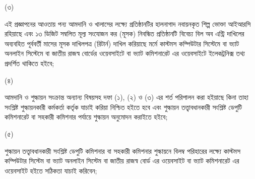 \documentclass[12pt]{article}
\begin{document}
\begin{minipage}[t]{0.05\linewidth}
\hspace{1em}
\end{minipage}
\begin{minipage}[t]{0.05\linewidth}
(৩)
\end{minipage}
\begin{minipage}[t]{0.9\linewidth}
এই প্রজ্ঞাপনের আওতায় পন্য আমদানি ও খালাসের লক্ষ্যে
প্রতিষ্ঠানটির হালনাগাদ নবায়নকৃত শিল্প ভোক্তা
আইআরসি রহিয়াছে এবং ১৩ ডিজিট সম্বলিত মূল্য
সংযোজন কর (মূসক) নিবন্ধিত প্রতিষ্ঠানটি বিবেচ্য
বিল অব এন্ট্রি দাখিলের অব্যবহিত পূর্ববর্তী মাসের
মূসক দাখিলপত্র (রিটার্ন) দাখিল করিয়াছে মর্মে
কাস্টমস  কম্পিউটার সিস্টেমে বা ভ্যাট অনলাইন সিস্টেমে
বা জাতীয় রাজস্ব বোর্ডের ওয়েবসাইটে বা ভ্যাট কমিশনারেট
এর ওয়েবসাইটে ইলেকট্রনিক্স তথ্য প্রদর্শিত থাকিতে হইবে;
\\
\end{minipage}
\begin{minipage}[t]{0.05\linewidth}
\hspace{1em}
\end{minipage}
\begin{minipage}[t]{0.05\linewidth}
(৪)
\end{minipage}
\begin{minipage}[t]{0.9\linewidth}
আমদানি ও শুল্কায়ন সংক্রান্ত অন্যান্য বিষয়সহ
দফা (১), (২) ও (৩) এর শর্ত পরিপালন করা হইয়াছে কিনা
তাহা সংশ্লিষ্ট শুল্কায়নকারী কর্মকর্তা কর্তৃক যাচাই করিয়া
নিশ্চিত হইতে হবে এবং শুল্কায়ন তত্ত্বাবধানকারী সংশ্লিষ্ট ডেপুটি
কমিশনারেট বা সহকারী কমিশনার পর্যায়ে শুল্কায়ন
অনুমোদন করাইতে হইবে;
\\
\end{minipage}
\begin{minipage}[t]{0.05\linewidth}
\hspace{1em}
\end{minipage}
\begin{minipage}[t]{0.05\linewidth}
(৫)
\end{minipage}
\begin{minipage}[t]{0.9\linewidth}
শুল্কায়ন তত্ত্বাবধানকারী সংশ্লিষ্ট ডেপুটি কমিশনার বা
সহকারী কমিশনার শুল্কায়নে বিলম্ব পরিহারের লক্ষ্যে
কাস্টমস কম্পিউটার সিস্টেম বা ভ্যাট
অনলাইন সিস্টেম বা জাতীয় রাজস্ব বোর্ড এর
ওয়েবসাইট বা ভ্যাট কমিশনারেট এর ওয়েবসাইট
হইতে সঠিকতা যাচাই করিবেন;
\\
\end{minipage}
\begin{minipage}[t]{0.05\linewidth}
\hspace{1em}
\end{minipage}
\end{document}
